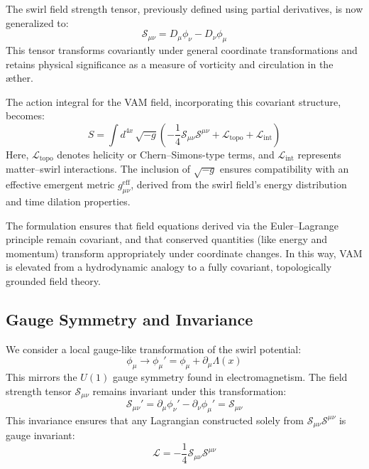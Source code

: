 \documentclass[a4paper,12pt]{article}
\begin{document}
        The swirl field strength tensor, previously defined using partial derivatives, is now generalized to:
        \begin{equation}
            \mathcal{S}_{\mu\nu} = D_\mu \phi_\nu - D_\nu \phi_\mu
        \end{equation}
        This tensor transforms covariantly under general coordinate transformations and retains physical significance as a measure of vorticity and circulation in the æther.

        The action integral for the VAM field, incorporating this covariant structure, becomes:
        \begin{equation}
            S = \int d^{4x} \, \sqrt{-g} \left( -\frac{1}{4} \mathcal{S}_{\mu\nu} \mathcal{S}^{\mu\nu} + \mathcal{L}_{\text{topo}} + \mathcal{L}_{\text{int}} \right)
        \end{equation}
        Here, $\mathcal{L}_{\text{topo}}$ denotes helicity or Chern–Simons-type terms, and $\mathcal{L}_{\text{int}}$ represents matter–swirl interactions. The inclusion of $\sqrt{-g}$ ensures compatibility with an effective emergent metric $g_{\mu\nu}^{\text{eff}}$, derived from the swirl field's energy distribution and time dilation properties.

        The formulation ensures that field equations derived via the Euler–Lagrange principle remain covariant, and that conserved quantities (like energy and momentum) transform appropriately under coordinate changes. In this way, VAM is elevated from a hydrodynamic analogy to a fully covariant, topologically grounded field theory.

        \subsection{Gauge Symmetry and Invariance}
        We consider a local gauge-like transformation of the swirl potential:
        \begin{equation}
            \phi_\mu \rightarrow \phi_\mu' = \phi_\mu + \partial_\mu \Lambda(x)
        \end{equation}
        This mirrors the $U(1)$ gauge symmetry found in electromagnetism. The field strength tensor $\mathcal{S}_{\mu\nu}$ remains invariant under this transformation:
        \begin{equation}
            \mathcal{S}_{\mu\nu}' = \partial_\mu \phi_\nu' - \partial_\nu \phi_\mu' = \mathcal{S}_{\mu\nu}
        \end{equation}
        This invariance ensures that any Lagrangian constructed solely from $\mathcal{S}_{\mu\nu} \mathcal{S}^{\mu\nu}$ is gauge invariant:
        \begin{equation}
            \mathcal{L} = -\frac{1}{4} \mathcal{S}_{\mu\nu} \mathcal{S}^{\mu\nu}
        \end{equation}
\end{document}
